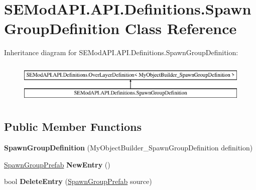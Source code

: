 \hypertarget{class_s_e_mod_a_p_i_1_1_a_p_i_1_1_definitions_1_1_spawn_group_definition}{}\section{S\+E\+Mod\+A\+P\+I.\+A\+P\+I.\+Definitions.\+Spawn\+Group\+Definition Class Reference}
\label{class_s_e_mod_a_p_i_1_1_a_p_i_1_1_definitions_1_1_spawn_group_definition}
Inheritance diagram for S\+E\+Mod\+A\+P\+I.\+A\+P\+I.\+Definitions.\+Spawn\+Group\+Definition\+:\begin{figure}[H]
\begin{center}
\leavevmode
\includegraphics[height=2.000000cm]{class_s_e_mod_a_p_i_1_1_a_p_i_1_1_definitions_1_1_spawn_group_definition}
\end{center}
\end{figure}
\subsection*{Public Member Functions}
\begin{DoxyCompactItemize}
\item 
\hypertarget{class_s_e_mod_a_p_i_1_1_a_p_i_1_1_definitions_1_1_spawn_group_definition_a53b515397b92356366926121dae3038e}{}{\bfseries Spawn\+Group\+Definition} (My\+Object\+Builder\+\_\+\+Spawn\+Group\+Definition definition)\label{class_s_e_mod_a_p_i_1_1_a_p_i_1_1_definitions_1_1_spawn_group_definition_a53b515397b92356366926121dae3038e}

\item 
\hypertarget{class_s_e_mod_a_p_i_1_1_a_p_i_1_1_definitions_1_1_spawn_group_definition_a5c235243b44b6bd70df2f21d7bac5400}{}\hyperlink{class_s_e_mod_a_p_i_1_1_a_p_i_1_1_definitions_1_1_spawn_group_prefab}{Spawn\+Group\+Prefab} {\bfseries New\+Entry} ()\label{class_s_e_mod_a_p_i_1_1_a_p_i_1_1_definitions_1_1_spawn_group_definition_a5c235243b44b6bd70df2f21d7bac5400}

\item 
\hypertarget{class_s_e_mod_a_p_i_1_1_a_p_i_1_1_definitions_1_1_spawn_group_definition_af0feffeae3799e2a7118a20cfe21d3d8}{}bool {\bfseries Delete\+Entry} (\hyperlink{class_s_e_mod_a_p_i_1_1_a_p_i_1_1_definitions_1_1_spawn_group_prefab}{Spawn\+Group\+Prefab} source)\label{class_s_e_mod_a_p_i_1_1_a_p_i_1_1_definitions_1_1_spawn_group_definition_af0feffeae3799e2a7118a20cfe21d3d8}

\end{DoxyCompactItemize}
